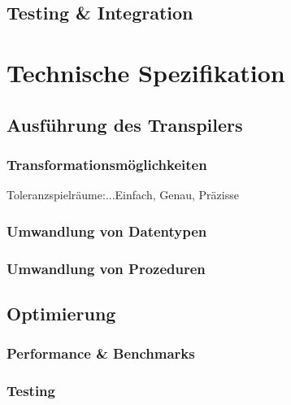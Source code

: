 \subsection{Testing & Integration}

\section{Technische Spezifikation}
	\subsection{Ausführung des Transpilers}
		\subsubsection{Transformationsmöglichkeiten}
		Toleranzspielräume:...Einfach, Genau, Präzisse
		\subsubsection{Umwandlung von Datentypen}
		\subsubsection{Umwandlung von Prozeduren}
	\subsection{Optimierung}
		\subsubsection{Performance & Benchmarks}
		\subsubsection{Testing}
